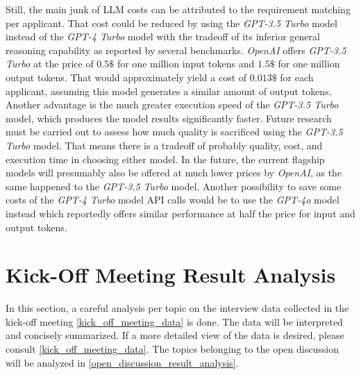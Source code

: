 \documentclass[draft,final]{thesisclass} %
\begin{document}
Still, the main junk of \gls{LLM} costs can be attributed to the requirement matching per applicant. That cost could be reduced by using the \textit{GPT-3.5 Turbo} model instead of the \textit{GPT-4 Turbo} model with the tradeoff of its inferior general reasoning capability as reported by several benchmarks. \textit{OpenAI} offers \textit{GPT-3.5 Turbo} at the price of $0.5\$$ for one million input tokens and $1.5\$$ for one million output tokens. That would approximately yield a cost of $0.013\$$ for each applicant, assuming this model generates a similar amount of output tokens. Another advantage is the much greater execution speed of the \textit{GPT-3.5 Turbo} model, which produces the model results significantly faster. Future research must be carried out to assess how much quality is sacrificed using the \textit{GPT-3.5 Turbo} model. That means there is a tradeoff of probably quality, cost, and execution time in choosing either model.
In the future, the current flagship models will presumably also be offered at much lower prices by \textit{OpenAI}, as the same happened to the \textit{GPT-3.5 Turbo} model. Another possibility to save some costs of the \textit{GPT-4 Turbo} model API calls would be to use the \textit{GPT-4o} model \parencite{gpt4o} instead which reportedly offers similar performance at half the price for input and output tokens.

\section{Kick-Off Meeting Result Analysis}
In this section, a careful analysis per topic on the interview data collected in the kick-off meeting \ref{kick_off_meeting_data} is done. The data will be interpreted and concisely summarized. If a more detailed view of the data is desired, please consult \ref{kick_off_meeting_data}. The topics belonging to the open discussion will be analyzed in \ref{open_discussion_result_analysis}.
\end{document}
